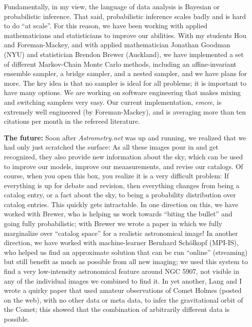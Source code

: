 \documentclass[11pt, letterpaper]{article}
\begin{document}
Fundamentally, in my view, the language of data analysis is Bayesian or probabilistic inference.
That said, probabilistic inference scales badly and is hard to do ``at scale''.
For this reason, we have been working with applied mathematicians and statisticians to improve our abilities.
With my students Hou and Foreman-Mackey, and with applied mathematician Jonathan Goodman (NYU) and statistician Brendon Brewer (Auckland),
  we have implemented a set of different Markov-Chain Monte Carlo methods,
  including an affine-invariant ensemble sampler, a bridge sampler, and a nested sampler,
  and we have plans for more.
The key idea is that no sampler is ideal for all problems; it is important to have many options.
We are working on software engineering that makes mixing and switching samplers very easy.
Our current implementation, \textsl{emcee}, is extremely well engineered (by Foreman-Mackey),
  and is averaging more than ten citations per month in the refereed literature.

\noindent\textbf{The future:}
Soon after \textsl{Astrometry.net} was up and running,
  we realized that we had only just scratched the surface:
As all these images pour in and get recognized, they also provide new information about the sky,
  which can be used to improve our models, improve our meaasurements, and revise our catalogs.
Of course, when you open this box, you realize it is a very difficult problem:
  If everything is up for debate and revision, then everything changes from being a catalog entry,
  or a fact about the sky, to being a probability distribution over catalog entries.
This quickly gets intractable.
In one direction on this, we have worked with Brewer,
  who is helping us work towards ``biting the bullet'' and going fully probabilistic;
  with Brewer we wrote a paper in which we fully marginalize over ``catalog space'' for a realistic astronomical image!
In another direction, we have worked with machine-learner Bernhard Sch\"olkopf (MPI-IS),
  who helped us find an approximate solution that can be run ``online'' (streaming) but still benefit
  as much as possible from all new imaging;
  we used this system to find a very low-intensity astronomical feature around NGC 5907,
  not visible in any of the individual images we combined to find it.
In yet another, Lang and I wrote a quirky paper that used amateur observations of Comet Holmes (posted on the web),
  with no other data or meta data,
  to infer the gravitational orbit of the Comet;
  this showed that the combination of arbitrarily different data is possible.
\end{document}
